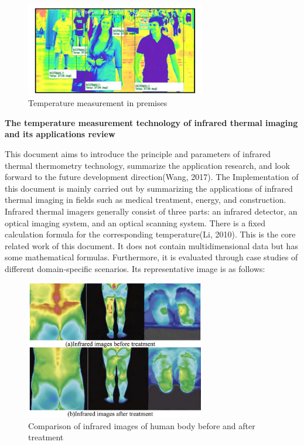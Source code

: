 \documentclass[12pt]{article}
\begin{document}
\begin{figure}[H]
\centering
\includegraphics[width=0.7\textwidth]{Paper7.pic.jpg}
\caption{Temperature measurement in premises} 
\end{figure}

\noindent \textbf{The temperature measurement technology of infrared thermal imaging and its applications review}

\noindent This document aims to introduce the principle and parameters of infrared thermal thermometry technology, summarize the application research, and look forward to the future development direction(Wang, 2017). The Implementation of this document is mainly carried out by summarizing the applications of infrared thermal imaging in fields such as medical treatment, energy, and construction. Infrared thermal imagers generally consist of three parts: an infrared detector, an optical imaging system, and an optical scanning system. There is a fixed calculation formula for the corresponding temperature(Li, 2010). This is the core related work of this document. It does not contain multidimensional data but has some mathematical formulas. Furthermore, it is evaluated through case studies of different domain-specific scenarios. Its representative image is as follows:

\begin{figure}[H]
\centering
\includegraphics[width=0.7\textwidth]{Paper8.pic.jpg}
\caption{Comparison of infrared images of human body before and after treatment} 
\end{figure}
    
\end{document}
